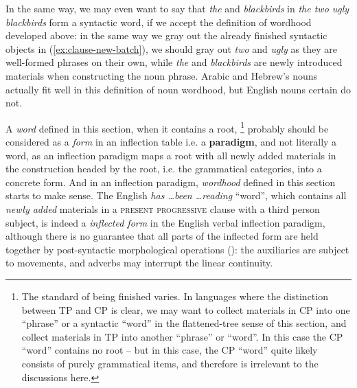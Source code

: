 \documentclass[a4paper, oneside, scheme=plain, 12pt]{article}
\newcommand*{\concept}[1]{\textbf{#1}}
\newcommand*{\term}[1]{\emph{#1}}
\newcommand{\form}[1]{\emph{#1}}
\newcommand*{\category}[1]{\textsc{#1}}
\begin{document}
In the same way, we may even want to say that \form{the} and \form{blackbirds} 
in \form{the two ugly blackbirds} form a syntactic word,
if we accept the definition of wordhood developed above:
in the same way we gray out the already finished syntactic objects in (\ref{ex:clause-new-batch}),
we should gray out \form{two} and \form{ugly} as they are well-formed phrases on their own,
while \form{the} and \form{blackbirds} are newly introduced materials
when constructing the noun phrase.
Arabic and Hebrew's nouns actually fit well in this definition of noun wordhood,
but English nouns certain do not.

A \term{word} defined in this section, when it contains a root,%
\footnote{
    The standard of being finished varies.
    In languages where the distinction between TP and CP is clear,
    we may want to collect materials in CP into one ``phrase'' or a syntactic ``word'' in the flattened-tree sense of this section,
    and collect materials in TP into another ``phrase'' or ``word''.
    In this case the CP ``word'' contains no root
    -- but in this case, the CP ``word'' quite likely consists of purely grammatical items,
    and therefore is irrelevant to the discussions here.
}
probably should be considered as a \term{form} in an inflection table i.e. a \concept{paradigm}, and not literally a word,
as an inflection paradigm maps a root with all newly added materials in the construction headed by the root,
i.e. the grammatical categories, into a concrete form.
And in an inflection paradigm, \term{wordhood} defined in this section starts to make sense.
The English \form{has \dots been \dots reading} ``word'',
which contains all \emph{newly added} materials in a \category{present progressive} clause 
with a third person subject,
is indeed a \term{inflected form} in the English verbal inflection paradigm,
although there is no guarantee that all parts of the inflected form are held together
by post-syntactic morphological operations ():
the auxiliaries are subject to movements, and adverbs may interrupt the linear continuity.
\end{document}
